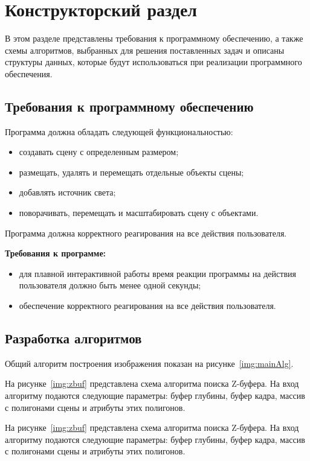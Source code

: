 \chapter{Конструкторский раздел}

В этом разделе представлены требования к программному обеспечению, а также схемы алгоритмов, выбранных для решения поставленных задач и описаны структуры данных, которые будут использоваться при реализации программного обеспечения.

\section{Требования к программному обеспечению}
Программа должна обладать следующей функциональностью:
\begin{itemize}
	\item создавать сцену с определенным размером;
	\item размещать, удалять и перемещать отдельные объекты сцены;
	\item добавлять источник света;
	\item поворачивать, перемещать и масштабировать сцену с объектами.
\end{itemize}

Программа должна корректного реагирования на все действия пользователя.

\textbf{Требования к программе: }
\begin{itemize}
	\item для плавной интерактивной работы время реакции программы на действия пользователя должно быть менее одной секунды;
	\item обеспечение корректного реагирования на все действия пользователя.
\end{itemize}
\fi 





\section{Разработка алгоритмов}

Общий алгоритм построения изображения показан на рисунке~\ref{img:mainAlg}.

На рисунке~\ref{img:zbuf} представлена схема алгоритма поиска Z-буфера.
На вход алгоритму подаются следующие параметры: буфер глубины, буфер кадра,
массив с полигонами сцены и атрибуты этих полигонов.

На рисунке~\ref{img:zbuf} представлена схема алгоритма поиска Z-буфера.
На вход алгоритму подаются следующие параметры: буфер глубины, буфер кадра,
массив с полигонами сцены и атрибуты этих полигонов.

